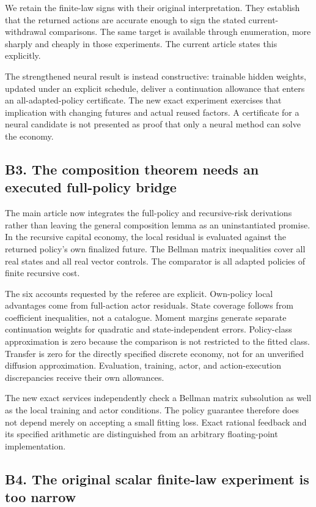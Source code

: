 \documentclass[ecta,nameyear,draft]{econsocart}
\theoremstyle{definition}
\theoremstyle{remark}
\begin{document}
We retain the finite-law signs with their original interpretation. They establish that the returned actions are accurate enough to sign the stated current-withdrawal comparisons. The same target is available through enumeration, more sharply and cheaply in those experiments. The current article states this explicitly.

The strengthened neural result is instead constructive: trainable hidden weights, updated under an explicit schedule, deliver a continuation allowance that enters an all-adapted-policy certificate. The new exact experiment exercises that implication with changing futures and actual reused factors. A certificate for a neural candidate is not presented as proof that only a neural method can solve the economy.

\subsection*{B3. The composition theorem needs an executed full-policy bridge}

The main article now integrates the full-policy and recursive-risk derivations rather than leaving the general composition lemma as an uninstantiated promise. In the recursive capital economy, the local residual is evaluated against the returned policy's own finalized future. The Bellman matrix inequalities cover all real states and all real vector controls. The comparator is all adapted policies of finite recursive cost.

The six accounts requested by the referee are explicit. Own-policy local advantages come from full-action actor residuals. State coverage follows from coefficient inequalities, not a catalogue. Moment margins generate separate continuation weights for quadratic and state-independent errors. Policy-class approximation is zero because the comparison is not restricted to the fitted class. Transfer is zero for the directly specified discrete economy, not for an unverified diffusion approximation. Evaluation, training, actor, and action-execution discrepancies receive their own allowances.

The new exact services independently check a Bellman matrix subsolution as well as the local training and actor conditions. The policy guarantee therefore does not depend merely on accepting a small fitting loss. Exact rational feedback and its specified arithmetic are distinguished from an arbitrary floating-point implementation.

\subsection*{B4. The original scalar finite-law experiment is too narrow}
\end{document}
